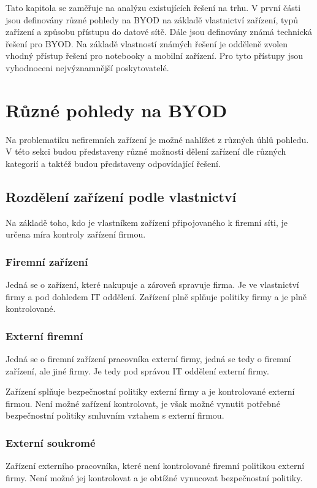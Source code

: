 Tato kapitola se zaměřuje na analýzu existujících řešení na trhu. V první části jsou definovány různé pohledy na BYOD na základě vlastnictví zařízení, typů zařízení a způsobu přístupu do datové sítě. Dále jsou definovány známá technická řešení pro BYOD. Na základě vlastností známých řešení je odděleně zvolen vhodný přístup řešení pro notebooky a mobilní zařízení. Pro tyto přístupy jsou vyhodnoceni nejvýznamnější poskytovatelé. 


 \section{Různé pohledy na BYOD}
 Na problematiku nefiremních zařízení je možné nahlížet z různých úhlů pohledu. V této sekci budou představeny různé možnosti dělení zařízení dle různých kategorií a taktéž budou představeny odpovídající řešení.
 
 \subsection{Rozdělení zařízení podle vlastnictví}
 Na základě toho, kdo je vlastníkem zařízení připojovaného k firemní síti, je určena míra kontroly zařízení firmou.
 
 \subsubsection{Firemní zařízení}
 Jedná se o zařízení, které nakupuje a zároveň spravuje firma. Je ve vlastnictví firmy a pod dohledem IT oddělení. Zařízení plně splňuje politiky firmy a je plně kontrolované.
 
 \subsubsection{Externí firemní}
 Jedná se o firemní zařízení pracovníka externí firmy, jedná se tedy o firemní zařízení, ale jiné firmy. Je tedy pod správou IT oddělení externí firmy.
 
 Zařízení splňuje bezpečnostní politiky externí firmy a je kontrolované externí firmou. Není možné zařízení kontrolovat, je však možné vynutit potřebné bezpečnostní politiky smluvním vztahem s externí firmou.
 
 \subsubsection{Externí soukromé}
 Zařízení externího pracovníka, které není kontrolované firemní politikou externí firmy. Není možné jej kontrolovat a je obtížné vynucovat bezpečnostní politiky.
 
